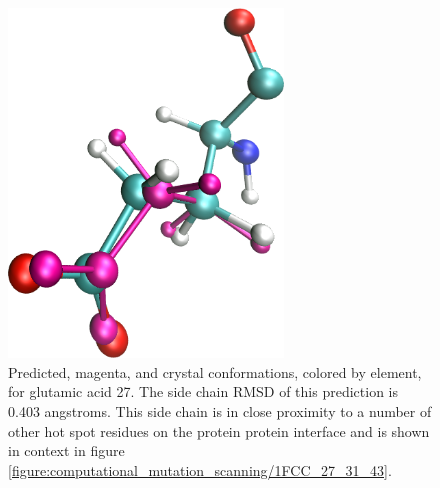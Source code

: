 \begin{figure}[h]
  \centering
  \includegraphics[width=0.65\textwidth,height=0.3\textheight,keepaspectratio]{figures/mutation_side_chain_images/1fcc_27.png}
  \caption{Predicted, magenta, and crystal conformations, colored by element, for glutamic acid 27.
The side chain RMSD of this prediction is 0.403 angstroms.
This side chain is in close proximity to a number of other hot spot residues on the protein protein interface and is shown in context in figure \protect\ref{figure:computational_mutation_scanning/1FCC_27_31_43}.}
  \label{figure:computational_mutation_scanning/1FCC_27}
\end{figure}

